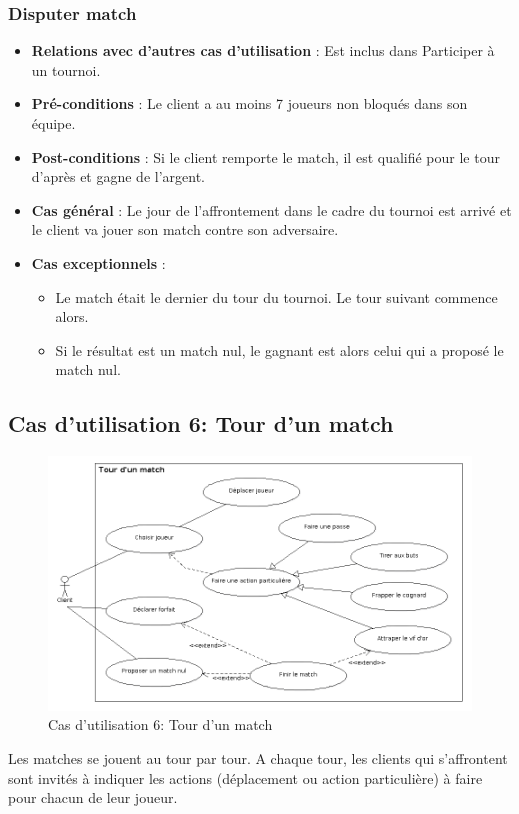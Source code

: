 \documentclass[a4paper,titlepage]{scrreprt}
\begin{document}
        \subsubsection{Disputer match}
      \begin{itemize}
        \item \textbf{Relations avec d'autres cas d'utilisation}  : Est inclus dans Participer à un tournoi.
        \item \textbf{Pré-conditions} : Le client a au moins 7 joueurs non bloqués dans son équipe.
        \item \textbf{Post-conditions} : Si le client remporte le match, il est qualifié pour le tour d'après et gagne de l'argent.
        \item \textbf{Cas général} : Le jour de l'affrontement dans le cadre du tournoi est arrivé et le client va jouer son match contre son adversaire.
        \item \textbf{Cas exceptionnels} :
          \begin{itemize}
            \item Le match était le dernier du tour du tournoi. Le tour suivant commence alors.
            \item Si le résultat est un match nul, le gagnant est alors celui qui a proposé le match nul.
          \end{itemize}
      \end{itemize}


  \subsection{Cas d'utilisation 6: Tour d'un match}
  \begin{figure}[H]
    \center
    \includegraphics[scale=0.5]{uml/useCaseView/TourMatch.png}
    \caption{Cas d'utilisation 6: Tour d'un match}
  \end{figure}  
    Les matches se jouent au tour par tour. A chaque tour, les clients qui s'affrontent sont invités à indiquer les actions (déplacement ou action particulière) à faire pour chacun de leur joueur. %
\end{document}
